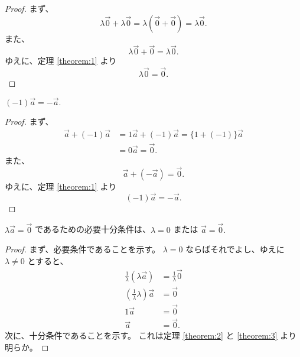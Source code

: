 \begin{proof}
  まず、
  \[\lambda\vec{0}+\lambda\vec{0}=\lambda(\vec{0}+\vec{0})=\lambda\vec{0}.\]
  また、
  \[\lambda\vec{0}+\vec{0}=\lambda\vec{0}.\]
  ゆえに、定理 \ref{theorem:1} より
  \[\lambda\vec{0}=\vec{0}.\]
\end{proof}

\begin{thm}\label{theorem:4}
  \((-1)\vec{a}=-\vec{a}.\)
\end{thm}

\begin{proof}
  まず、
  \begin{align*}
    \vec{a}+(-1)\vec{a} &= 1\vec{a}+(-1)\vec{a}=\{1+(-1)\}\vec{a} \\
                        &= 0\vec{a}=\vec{0}.
  \end{align*}
  また、
  \[\vec{a}+(-\vec{a})=\vec{0}.\]
  ゆえに、定理 \ref{theorem:1} より
  \[(-1)\vec{a}=-\vec{a}.\]
\end{proof}

\begin{thm}\label{theorem:5}
  \(\lambda\vec{a}=\vec{0}\) であるための必要十分条件は、\(\lambda=0\) または \(\vec{a}=\vec{0}.\)
\end{thm}

\begin{proof}
  まず、必要条件であることを示す。
  \(\lambda=0\) ならばそれでよし、ゆえに \(\lambda\neq0\) とすると、
  \begin{align*}
               \frac{1}{\lambda}(\lambda\vec{a}) &= \frac{1}{\lambda}\vec{0} \\
    \left(\frac{1}{\lambda}\lambda\right)\vec{a} &= \vec{0} \\
                                        1\vec{a} &= \vec{0} \\
                                         \vec{a} &= \vec{0}.
  \end{align*}
  次に、十分条件であることを示す。
  これは定理 \ref{theorem:2} と \ref{theorem:3} より明らか。
\end{proof}

